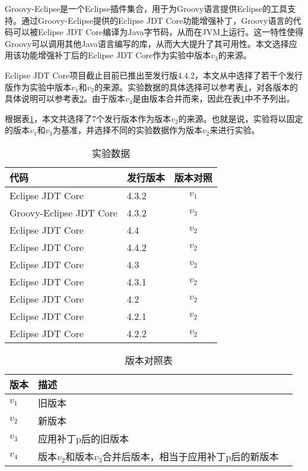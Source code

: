 Groovy-Eclipse是一个Eclipse插件集合，用于为Groovy语言提供Eclipse的工具支持。通过Groovy-Eclipse提供的Eclipse JDT Core功能增强补丁，Groovy语言的代码可以被Eclipse JDT Core编译为Java字节码，从而在JVM上运行。这一特性使得Groovy可以调用其他Java语言编写的库，从而大大提升了其可用性。本文选择应用该功能增强补丁后的Eclipse JDT Core作为实验中版本$v_3$的来源。

Eclipse JDT Core项目截止目前已推出至发行版4.4.2，本文从中选择了若干个发行版作为实验中版本$v_1$和$v_2$的来源。实验数据的具体选择可以参考表\ref {exp_data}，对各版本的具体说明可以参考表\ref {exp_version}。由于版本$v_4$是由版本合并而来，因此在表\ref {exp_data}中不予列出。

根据表\ref {exp_data}，本文共选择了7个发行版本作为版本$v_2$的来源。也就是说，实验将以固定的版本$v_1$和$v_3$为基准，并选择不同的实验数据作为版本$v_2$来进行实验。


\begin{table}[H]
	\caption{实验数据}
	\label{exp_data}
	\centering
	\begin{tabular}{llc}
		\toprule[1.5pt]
		{\heiti 代码} & {\heiti 发行版本} & {\heiti 版本对照} \\\midrule[1pt]
		Eclipse JDT Core & 4.3.2 & $v_1$ \\
		Groovy-Eclipse JDT Core & 4.3.2 & $v_3$\\
		Eclipse JDT Core & 4.4 & $v_2$\\
		Eclipse JDT Core & 4.4.2 & $v_2$\\
		Eclipse JDT Core & 4.3 & $v_2$\\
		Eclipse JDT Core & 4.3.1 & $v_2$\\
		Eclipse JDT Core & 4.2 & $v_2$\\
		Eclipse JDT Core & 4.2.1 & $v_2$\\
		Eclipse JDT Core & 4.2.2 & $v_2$\\
		\bottomrule[1.5pt]
	\end{tabular}
\end{table}

\begin{table}
	\caption{版本对照表}
	\label{exp_version}
	\centering
	\begin{tabular}{llc}
		\toprule[1.5pt]
		{\heiti 版本} & {\heiti 描述} \\\midrule[1pt]
		$v_1$ & 旧版本 \\
		$v_2$ & 新版本\\
		$v_3$ & 应用补丁p后的旧版本\\
		$v_4$ & 版本$v_2$和版本$v_3$合并后版本，相当于应用补丁p后的新版本\\
		\bottomrule[1.5pt]
	\end{tabular}
\end{table}


